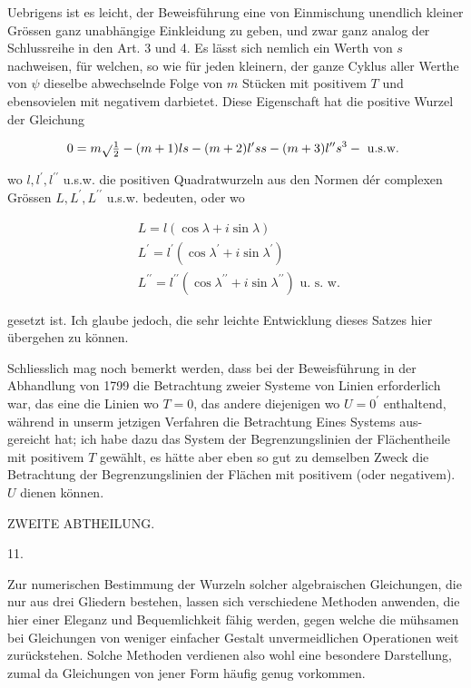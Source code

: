 \documentclass[twoside,12pt, showframe]{memoir}
\let\oldfrac\frac
\def\frac#1#2{\mathchoice{\tfrac{#1}{#2}}{\oldfrac{#1}{#2}}{\genfrac{}{}{}{2}{#1}{#2\mathstrut}}{\genfrac{}{}{}{3}{#1}{#2\mathstrut}}}
\begin{document}
Uebrigens ist es leicht, der Beweisführung eine von Einmischung unendlich kleiner Grössen ganz unabhängige Einkleidung zu geben, und zwar ganz analog der Schlussreihe in den Art. 3 und 4. Es lässt sich nemlich ein Werth von \(s\) nachweisen, für welchen, so wie für jeden kleinern, der ganze Cyklus aller Werthe von \(\psi\) dieselbe abwechselnde Folge von \(m\) Stücken mit positivem \(T\) und ebensovielen mit negativem darbietet. Diese Eigenschaft hat die positive Wurzel der Gleichung

\[
0=m \sqrt{ } \frac{1}{2}-(m+1) l s-(m+2) l^{\prime} s s-(m+3) l^{\prime \prime} s^{3}-\text { u.s.w. }
\]

wo \(l, l^{\prime}, l^{\prime \prime}\) u.s.w. die positiven Quadratwurzeln aus den Normen dér complexen Grössen \(L, L^{\prime}, L^{\prime \prime}\) u.s.w. bedeuten, oder wo

\[
\begin{aligned}
& L=l(\cos \lambda+i \sin \lambda) \\
& L^{\prime}=l^{\prime}\left(\cos \lambda^{\prime}+i \sin \lambda^{\prime}\right) \\
& L^{\prime \prime}=l^{\prime \prime}\left(\cos \lambda^{\prime \prime}+i \sin \lambda^{\prime \prime}\right) \text { u. s. w. }
\end{aligned}
\]

gesetzt ist. Ich glaube jedoch, die sehr leichte Entwicklung dieses Satzes hier übergehen zu können.

Schliesslich mag noch bemerkt werden, dass bei der Beweisführung in der Abhandlung von 1799 die Betrachtung zweier Systeme von Linien erforderlich war, das eine die Linien wo \(T=0\), das andere diejenigen wo \(U=0^{\prime}\) enthaltend, während in unserm jetzigen Verfahren die Betrachtung Eines Systems aus-
gereicht hat; ich habe dazu das System der Begrenzungslinien der Flächentheile mit positivem \(T\) gewählt, es hätte aber eben so gut zu demselben Zweck die Betrachtung der Begrenzungslinien der Flächen mit positivem (oder negativem). \(U\) dienen können.

ZWEITE ABTHEILUNG.

11.

Zur numerischen Bestimmung der Wurzeln solcher algebraischen Gleichungen, die nur aus drei Gliedern bestehen, lassen sich verschiedene Methoden anwenden, die hier einer Eleganz und Bequemlichkeit fähig werden, gegen welche die mühsamen bei Gleichungen von weniger einfacher Gestalt unvermeidlichen Operationen weit zurückstehen. Solche Methoden verdienen also wohl eine besondere Darstellung, zumal da Gleichungen von jener Form häufig genug vorkommen.
\end{document}
